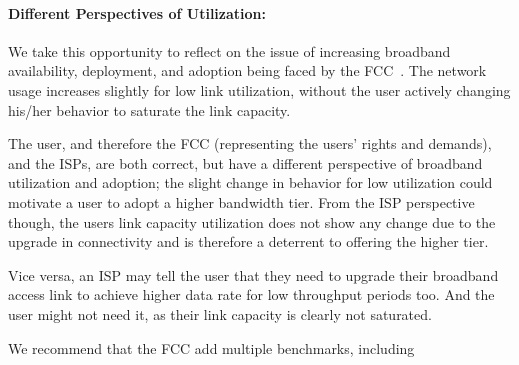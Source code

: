 \paragraph{Different Perspectives of Utilization: }We take this opportunity to reflect on the issue of increasing broadband availability, deployment, and adoption being faced by the FCC~\cite{fcc2015progress-report}. The network usage increases slightly for low link utilization, without the user actively changing his/her behavior to saturate the link capacity.

The user, and therefore the FCC (representing the users' rights and demands), and the ISPs, are both correct, but have a different perspective of broadband utilization and adoption; the slight change in behavior for low utilization could motivate a user to adopt a higher bandwidth tier. From the ISP perspective though, the users link capacity utilization does not show any change due to the upgrade in connectivity and is therefore a deterrent to offering the higher tier.

Vice versa, an ISP may tell the user that they need to upgrade their broadband access link to achieve higher data rate for low throughput periods too. And the user might not need it, as their link capacity is clearly not saturated. 

We recommend that the FCC add multiple benchmarks, including 
